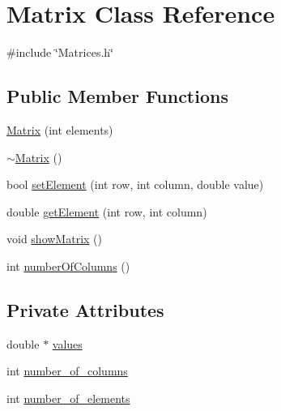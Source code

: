 \hypertarget{classMatrix}{\section{Matrix Class Reference}
\label{classMatrix}
}


{\ttfamily \#include \char`\"{}Matrices.\-h\char`\"{}}

\subsection*{Public Member Functions}
\begin{DoxyCompactItemize}
\item 
\hyperlink{classMatrix_a6c846d0a46676ff6addbcd04e2d516cc}{Matrix} (int elements)
\item 
\hyperlink{classMatrix_a9b1c3627f573d78a2f08623fdfef990f}{$\sim$\-Matrix} ()
\item 
bool \hyperlink{classMatrix_a98ba0c156a03a068759c4c2b8eb837eb}{set\-Element} (int row, int column, double value)
\item 
double \hyperlink{classMatrix_a37b3a00db12f5838c164960ecf2ce42e}{get\-Element} (int row, int column)
\item 
void \hyperlink{classMatrix_ad5fe18fa5ffe97bda044000d45bf1547}{show\-Matrix} ()
\item 
int \hyperlink{classMatrix_af4421f66ac5f486116ebfe10f2cced18}{number\-Of\-Columns} ()
\end{DoxyCompactItemize}
\subsection*{Private Attributes}
\begin{DoxyCompactItemize}
\item 
double $\ast$ \hyperlink{classMatrix_a19505b0b139553ad1ee2291f3d8385a9}{values}
\item 
int \hyperlink{classMatrix_afd4ab1ffa8fadfcaae4ebcf7802c0fef}{number\-\_\-of\-\_\-columns}
\item 
int \hyperlink{classMatrix_ad88772bca79eec502f3737b027431c60}{number\-\_\-of\-\_\-elements}
\end{DoxyCompactItemize}


